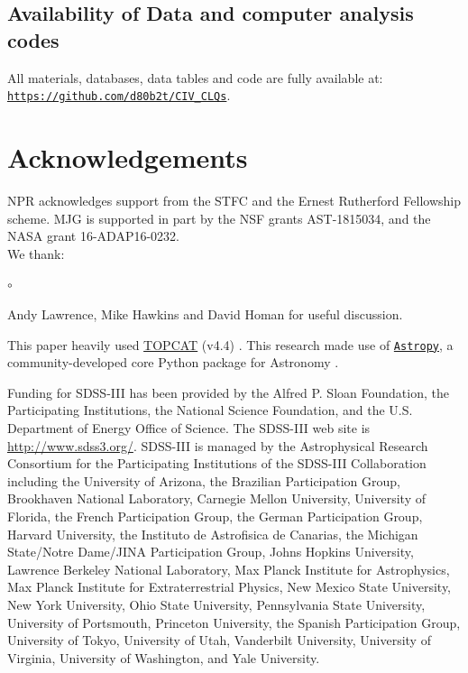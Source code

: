 \documentclass[fleqn,usenatbib]{mnras}
\begin{document}
\subsection*{Availability of Data and computer analysis codes} 
All materials, databases, data tables and code are fully available at: 
\href{https://github.com/d80b2t/CIV_CLQs}{\tt https://github.com/d80b2t/CIV\_CLQs}.


\section*{Acknowledgements}
NPR acknowledges support from the STFC and the Ernest Rutherford Fellowship scheme. 
MJG is supported in part by the NSF grants AST-1815034, and the NASA grant 16-ADAP16-0232. 
\\

\noindent
We thank:
\begin{list}{$\circ$}{}
  \item Andy Lawrence, Mike Hawkins and David Homan for useful discussion.
\end{list}

This paper heavily used \href{http://www.star.bris.ac.uk/~mbt/topcat/}{TOPCAT} (v4.4)
\citep[][]{Taylor2005, Taylor2011}.
This research made use of \href{http://www.astropy.org}{\tt Astropy}, 
a community-developed core Python package for Astronomy 
\citep{AstropyCollaboration2013, AstropyCollaboration2018}.

Funding for SDSS-III has been provided by the Alfred P. Sloan
Foundation, the Participating Institutions, the National Science
Foundation, and the U.S. Department of Energy Office of Science. The
SDSS-III web site is
\href{http://www.sdss3.org/}{http://www.sdss3.org/}.
SDSS-III is managed by the Astrophysical Research Consortium for the
Participating Institutions of the SDSS-III Collaboration including the
University of Arizona, the Brazilian Participation Group, Brookhaven
National Laboratory, Carnegie Mellon University, University of
Florida, the French Participation Group, the German Participation
Group, Harvard University, the Instituto de Astrofisica de Canarias,
the Michigan State/Notre Dame/JINA Participation Group, Johns Hopkins
University, Lawrence Berkeley National Laboratory, Max Planck
Institute for Astrophysics, Max Planck Institute for Extraterrestrial
Physics, New Mexico State University, New York University, Ohio State
University, Pennsylvania State University, University of Portsmouth,
Princeton University, the Spanish Participation Group, University of
Tokyo, University of Utah, Vanderbilt University, University of
Virginia, University of Washington, and Yale University.
\end{document}
